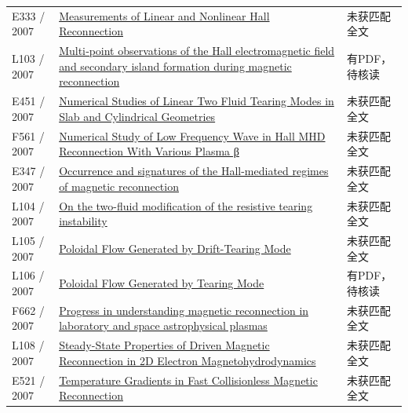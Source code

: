 \begin{longtable}{P{24mm}P{97mm}P{27mm}}
E333 / 2007 & \href{http://absimage.aps.org/image/DPP07/MWS_DPP07-2007-001493.pdf}{Measurements of Linear and Nonlinear Hall Reconnection} & 未获匹配全文\\

L103 / 2007 & \href{https://doi.org/10.1029/2006ja012158}{Multi‐point observations of the Hall electromagnetic field and secondary island formation during magnetic reconnection} & 有PDF，待核读\\

E451 / 2007 & \href{http://absimage.aps.org/image/DPP07/MWS_DPP07-2007-001372.pdf}{Numerical Studies of Linear Two Fluid Tearing Modes in Slab and Cylindrical Geometries} & 未获匹配全文\\

F561 / 2007 & \href{https://doi.org/10.11728/cjss2007.02.096}{Numerical Study of Low Frequency Wave in Hall MHD Reconnection With Various Plasma β} & 未获匹配全文\\

E347 / 2007 & \href{https://ui.adsabs.harvard.edu/abs/2007AGUSMSM54A..05V/abstract}{Occurrence and signatures of the Hall-mediated regimes of magnetic reconnection} & 未获匹配全文\\

L104 / 2007 & \href{https://doi.org/10.1063/1.2759893}{On the two-fluid modification of the resistive tearing instability} & 未获匹配全文\\

L105 / 2007 & \href{https://doi.org/10.1143/jpsj.77.014501}{Poloidal Flow Generated by Drift-Tearing Mode} & 未获匹配全文\\

L106 / 2007 & \href{https://doi.org/10.15017/26835}{Poloidal Flow Generated by Tearing Mode} & 有PDF，待核读\\

F662 / 2007 & \href{https://doi.org/10.1063/1.2740595}{Progress in understanding magnetic reconnection in laboratory and space astrophysical plasmas} & 未获匹配全文\\

L108 / 2007 & \href{https://doi.org/10.1103/physrevlett.99.235001}{Steady-State Properties of Driven Magnetic Reconnection in 2D Electron Magnetohydrodynamics} & 未获匹配全文\\

E521 / 2007 & \href{https://doi.org/10.1103/physrevlett.98.265002}{Temperature Gradients in Fast Collisionless Magnetic Reconnection} & 未获匹配全文\\


\end{longtable}
